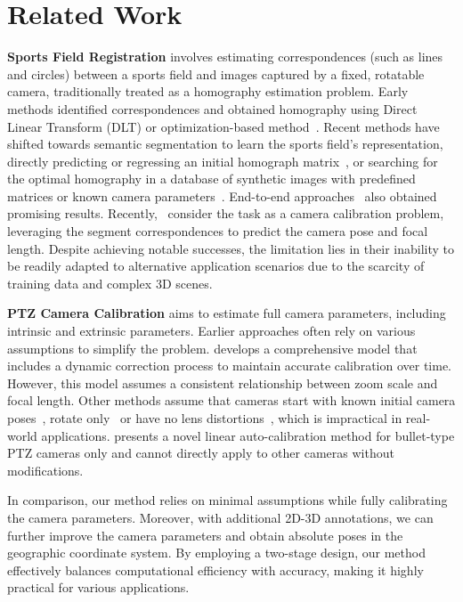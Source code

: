 \section{Related Work}\label{sec:related}

\textbf{Sports Field Registration}
involves estimating correspondences (such as lines and circles) between a sports field and images captured by a fixed, rotatable camera, traditionally treated as a homography estimation problem. Early methods identified correspondences and obtained homography using Direct Linear Transform (DLT) or optimization-based method~\cite{homayounfar2017sports, Gupta:2011:ULE,Nie2021ARA}. Recent methods have shifted towards semantic segmentation to learn the sports field's representation, directly predicting or regressing an initial homograph matrix~\cite{jiang2020optimizing}, or searching for the optimal homography in a database of synthetic images with predefined matrices or known camera parameters~\cite{Sha:2020:EtE,Chen2019SportsCC}. End-to-end approaches~\cite{SFLNet} also obtained promising results.
Recently,~\cite{Theiner:2023:TVCalib,Marc:2024:NBJW} consider the task as a camera calibration problem, leveraging the segment correspondences to predict the camera pose and focal length. 
Despite achieving notable successes, the limitation lies in their inability to be readily adapted to alternative application scenarios due to the scarcity of training data and complex 3D scenes.

\textbf{PTZ Camera Calibration }
aims to estimate full camera parameters, including intrinsic and extrinsic parameters.
Earlier approaches often rely on various assumptions to simplify the problem. \cite{Wu:2013:KPTZ} develops a comprehensive model that includes a dynamic correction process to maintain accurate calibration over time. However, this model assumes a consistent relationship between zoom scale and focal length.
Other methods assume that cameras start with known initial camera poses~\cite{PTZ-SLAM}, rotate only~\cite{selfcalib1997} or have no lens distortions~\cite{chen2018two}, which is impractical in real-world applications. \cite{Liu:2023:LAC} presents a novel linear auto-calibration method for bullet-type PTZ cameras only and cannot directly apply to other cameras without modifications. 

In comparison, our method relies on minimal assumptions while fully calibrating the camera parameters. Moreover, with additional 2D-3D annotations, we can further improve the camera parameters and obtain absolute poses in the geographic coordinate system. By employing a two-stage design, our method effectively balances computational efficiency with accuracy, making it highly practical for various applications.